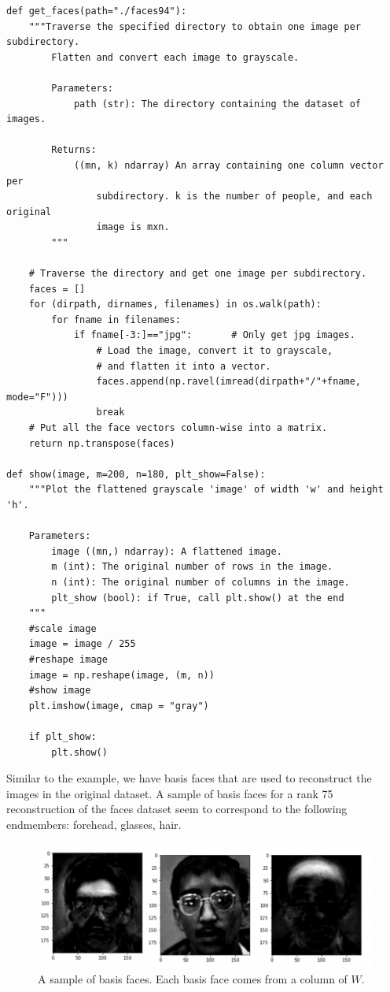\begin{lstlisting}
def get_faces(path="./faces94"):
    """Traverse the specified directory to obtain one image per subdirectory.
        Flatten and convert each image to grayscale.

        Parameters:
            path (str): The directory containing the dataset of images.

        Returns:
            ((mn, k) ndarray) An array containing one column vector per
                subdirectory. k is the number of people, and each original
                image is mxn.
        """

    # Traverse the directory and get one image per subdirectory.
    faces = []
    for (dirpath, dirnames, filenames) in os.walk(path):
        for fname in filenames:
            if fname[-3:]=="jpg":       # Only get jpg images.
                # Load the image, convert it to grayscale,
                # and flatten it into a vector.
                faces.append(np.ravel(imread(dirpath+"/"+fname, mode="F")))
                break
    # Put all the face vectors column-wise into a matrix.
    return np.transpose(faces)

def show(image, m=200, n=180, plt_show=False):
    """Plot the flattened grayscale 'image' of width 'w' and height 'h'.

    Parameters:
        image ((mn,) ndarray): A flattened image.
        m (int): The original number of rows in the image.
        n (int): The original number of columns in the image.
        plt_show (bool): if True, call plt.show() at the end
    """
    #scale image
    image = image / 255
    #reshape image
    image = np.reshape(image, (m, n))
    #show image
    plt.imshow(image, cmap = "gray")

    if plt_show:
        plt.show()

\end{lstlisting}
Similar to the example, we have basis faces that are used to reconstruct the images in the original dataset.
A sample of basis faces for a rank 75 reconstruction of the faces dataset seem to correspond to the following endmembers: forehead, glasses, hair.

\begin{figure}[H]
\centering
\includegraphics[width=\textwidth]{figures/facial_features.pdf}
\caption{A sample of basis faces.
	      Each basis face comes from a column of $W$.}
\label{fig:basis_faces2}
\end{figure}


